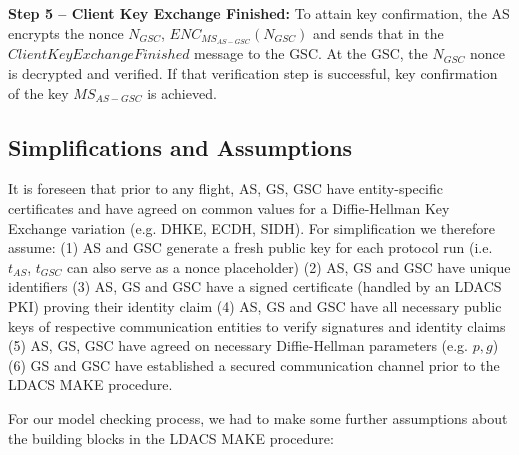 \vspace{0.5em}
\textbf{Step 5 -- Client Key Exchange Finished:} To attain key confirmation, the AS encrypts the nonce $N_{GSC}$, $\mathit{ENC}_{MS_{AS-GSC}}(N_{GSC})$ and sends that in the $ClientKeyExchangeFinished$ message to the \ac{GSC}. At the \ac{GSC}, the $N_{GSC}$ nonce is decrypted and verified. If that verification step is successful, key confirmation of the key $\mathit{MS}_{AS-GSC}$ is achieved.

\subsection{Simplifications and Assumptions}
\label{sec:SecurityAssumption}

It is foreseen that prior to any flight, AS, GS, GSC have entity-specific certificates and have agreed on common values for a Diffie-Hellman Key Exchange variation (e.g. \ac{DHKE}, \ac{ECDH}, \ac{SIDH}).
For simplification we therefore assume:
    (1) AS and GSC generate a fresh public key for each protocol run (i.e. $t_{AS}$, $t_{GSC}$ can also serve as a nonce placeholder)
	(2) AS, GS and GSC have unique identifiers
    (3) AS, GS and GSC have a signed certificate (handled by an LDACS \ac{PKI}) proving their identity claim
    (4) AS, GS and GSC have all necessary public keys of respective communication entities to verify signatures and identity claims
    (5) AS, GS, GSC have agreed on necessary Diffie-Hellman parameters (e.g. $p, g$)
    (6) GS and GSC have established a secured communication channel prior to the \ac{LDACS} \ac{MAKE} procedure.

For our model checking process, we had to make some further assumptions about the building blocks in the LDACS MAKE procedure:

